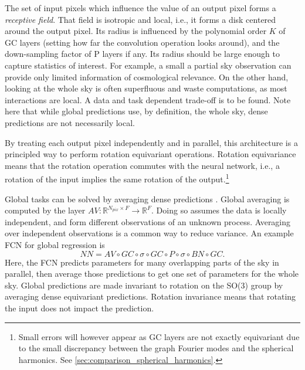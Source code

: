 \documentclass[final,twocolumn,3p,times,sort&compress]{elsarticle}
\newcommand{\1}{\b{1}}              %
\newcommand{\0}{\b{0}}              %
\newcommand{\R}{\mathbb{R}}
\begin{document}
The set of input pixels which influence the value of an output pixel forms a \textit{receptive field}.
That field is isotropic and local, i.e., it forms a disk centered around the output pixel.
Its radius is influenced by the polynomial order $K$ of GC layers (setting how far the convolution operation looks around), and the down-sampling factor of P layers if any.
Its radius should be large enough to capture statistics of interest.
For example, a small a partial sky observation can provide only limited information of cosmological relevance.
On the other hand, looking at the whole sky is often superfluous and waste computations, as most interactions are local.
A data and task dependent trade-off is to be found.
Note here that while global predictions use, by definition, the whole sky, dense predictions are not necessarily local.

By treating each output pixel independently and in parallel, this architecture is a principled way to perform rotation equivariant operations.
Rotation equivariance means that the rotation operation commutes with the neural network, i.e., a rotation of the input implies the same rotation of the output.\footnote{Small errors will however appear as GC layers are not exactly equivariant due to the small discrepancy between the graph Fourier modes and the spherical harmonics. See \ref{sec:comparison_spherical_harmonics}.}

Global tasks can be solved by averaging dense predictions \citep{lin2013globalavgpooling, springenberg2014allconv}.
Global averaging is computed by the layer $AV: \R^{N_{pix} \times F} \rightarrow \R^F$.
Doing so assumes the data is locally independent, and form different observations of an unknown process.
Averaging over independent observations is a common way to reduce variance.
An example FCN for global regression is
\begin{equation*}
	NN = AV \circ GC \circ \sigma \circ GC \circ P \circ \sigma \circ BN \circ GC.
\end{equation*}
Here, the FCN predicts parameters for many overlapping parts of the sky in parallel, then average those predictions to get one set of parameters for the whole sky.
Global predictions are made invariant to rotation on the SO(3) group by averaging dense equivariant predictions.
Rotation invariance means that rotating the input does not impact the prediction.
\end{document}
